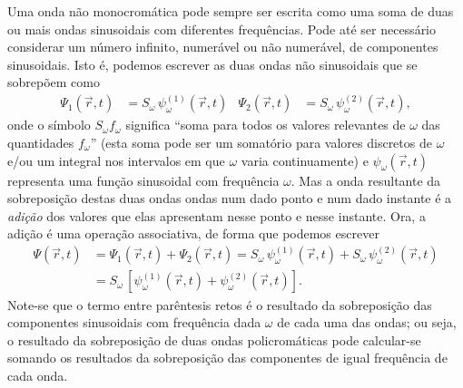 Uma onda não monocromática pode sempre ser escrita como uma soma de duas ou
mais ondas sinusoidais com diferentes frequências. Pode até ser necessário
considerar um número infinito, numerável ou não numerável, de componentes
sinusoidais.  Isto é, podemos escrever as duas ondas não sinusoidais que se
sobrepõem como
\begin{align*}
\Psi_1(\vec r,t)&=S_\omega\,\psi^{(1)}_\omega(\vec r,t)&
\Psi_2(\vec r,t)&=S_\omega\,\psi^{(2)}_\omega(\vec r,t),
\end{align*}
onde o símbolo $S_\omega f_\omega$ significa ``soma para todos os valores
relevantes de $\omega$ das quantidades $f_\omega$'' (esta soma pode ser um
somatório para valores discretos de $\omega$ e/ou um integral nos intervalos em
que $\omega$ varia continuamente) e $\psi_\omega(\vec r,t)$ representa uma
função sinusoidal com frequência $\omega$. Mas a onda resultante da sobreposição
destas duas ondas ondas num dado ponto e num dado instante é a \emph{adição} dos
valores que elas apresentam nesse ponto e nesse instante. Ora, a
adição é uma operação associativa, de forma que podemos escrever
\begin{align*}
\Psi(\vec r,t)&=\Psi_1(\vec r,t)+\Psi_2(\vec r,t)=
S_\omega\,\psi^{(1)}_\omega(\vec r,t)+
S_\omega\,\psi^{(2)}_\omega(\vec r,t)\\
&=S_\omega\,\left[\psi^{(1)}_\omega(\vec r,t)+
  \psi^{(2)}_\omega(\vec r,t)\right].
\end{align*}
Note-se que o termo entre parêntesis retos é o resultado da sobreposição das
componentes sinusoidais com frequência dada $\omega$ de cada uma das ondas;
ou seja, o resultado da sobreposição de duas ondas policromáticas pode
calcular-se somando os resultados da sobreposição das componentes de igual
frequência de cada onda.

